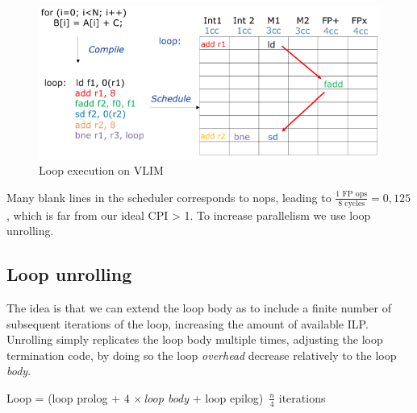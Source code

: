 \begin{figure}[h]
    \centering
    \includegraphics[scale = 0.4]{images/vliw-no-loop-unrolling}
    \caption{Loop execution on VLIM}
    \label{fig:vliw-no-loop-unrolling}
\end{figure}

Many blank lines in the scheduler corresponds to nops, leading to \(\frac{1\text{ FP ops}}{8\text{ cycles}} = 0,125\)
, which is far from our ideal CPI > 1.
To increase parallelism we use loop unrolling.

\clearpage
\subsection{Loop unrolling}
The idea is that we can extend the loop body as to include a finite number of subsequent iterations of the loop,
increasing the amount of available ILP\@.
Unrolling simply replicates the loop body multiple times, adjusting the loop termination code, by doing so the loop
\textit{overhead} decrease relatively to the loop \textit{body}.

\begin{center}
    Loop = (loop prolog + \(4\, \times\)\textit{loop body} + loop epilog) \texttimes $\, \frac{n}{4}$ iterations
\end{center}

